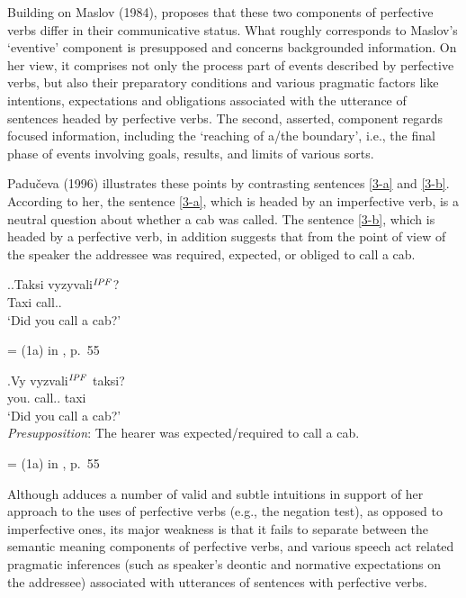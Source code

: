 Building on Maslov (1984), \citet{Paducheva:96, Paducheva:11} proposes that these two components of perfective verbs differ in their communicative status. What roughly corresponds to Maslov's `eventive' component is presupposed and concerns backgrounded information. On her view, it comprises not only the process part of events described by perfective verbs, but also their preparatory conditions and various pragmatic factors like intentions, expectations and obligations associated with the utterance of sentences headed by perfective verbs. The second, asserted, component regards focused information, including the `reaching of a/the boundary', i.e., the final phase of events involving goals, results, and limits of various sorts. 

Padu\v{c}eva (1996) illustrates these points by contrasting sentences \ref{3-a} and \ref{3-b}. According to her, the sentence \ref{3-a}, which is headed by an imperfective verb, is a neutral question about whether a cab was called. The sentence \ref{3-b}, which is headed by a perfective verb, in addition suggests that from the point of view of the speaker the addressee was required, expected, or obliged to call a cab. 

\ex.\label{3}\ag.\label{3-a}Taksi vyzyvali$^{\mathit{IPF}}$?\\
Taxi call..\\
\vspace{0.5em}
`Did you call a cab?'\\
\begin{flushright}
\vspace{-0.5em}
= (1a) in \citealt{Paducheva:96}, p.~55
\end{flushright}
\bg.\label{3-b}Vy vyzvali$^{\mathit{IPF}}$ taksi?\\
you. call.. taxi\\
\vspace{0.5em}
`Did you call a cab?'\\
\textit{Presupposition}: The hearer was expected/required to call a cab.
\begin{flushright}
\vspace{-0.5em}
= (1a) in \citealt{Paducheva:96}, p.~55
\end{flushright}

Although \citet{Paducheva:96} adduces a number of valid and subtle intuitions in support of her approach to the uses of perfective verbs (e.g., the negation test), as opposed to imperfective ones, its major weakness is that it fails to separate between the semantic meaning components of perfective verbs,  and various speech act related pragmatic inferences (such as speaker's deontic and normative expectations on the addressee) associated with utterances of sentences with perfective verbs. 
 
